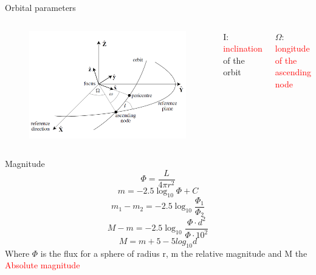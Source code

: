 \documentclass{beamer}
\begin{document}
\begin{frame}{Orbital parameters}
\begin{columns}
\begin{figure}[h]
\begin{center}
\includegraphics[width=\textwidth ]{Pic/Inclination.png}
\caption{\cite{murray1999solar}}
\label{Area_dynamics}
\end{center}
\end{figure}
\begin{center}
I: \textcolor{red}{inclination} of the orbit
\end{center}
\begin{center}
$\Omega$: \textcolor{red}{longitude of the ascending node}
\end{center}
\end{columns}
\end{frame}

\begin{frame}{Magnitude}
\begin{equation}
\Phi=\frac{L}{4\pi r^{2}}
\end{equation}
\begin{equation}
m=-2.5\log_{10}\Phi+C
\end{equation}
\begin{equation}
m_{1}-m_{2}=-2.5\log_{10}\frac{\Phi_{1}}{\Phi_{2}}
\end{equation}
\begin{equation}
M-m=-2.5\log_{10}\frac{\Phi\cdot d^{2} }{\Phi\cdot 10^{2}}
\end{equation}
\begin{equation}
M=m+5-5log_{10}d
\end{equation}
Where $\Phi$ is the flux for a sphere of radius r, m the relative magnitude and M the \textcolor{red}{Absolute magnitude}
\end{frame}
\end{document}
